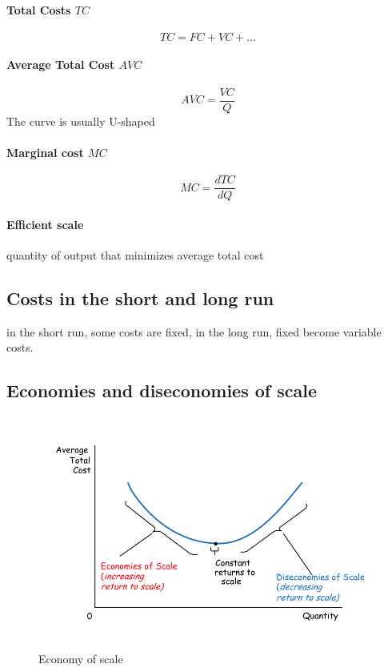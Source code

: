 \documentclass[a4paper,titlepage] {scrartcl}
\begin{document}
\paragraph{Total Costs $TC$} %
\label{par:total_costs_tc_}
\begin{equation}
	TC = FC + VC +\dots
\end{equation}

\paragraph{Average Total Cost $AVC$} %
\label{par:average_total_cost}
\begin{equation}
	AVC = \frac{VC}{Q}
\end{equation}
The curve is usually U-shaped

\paragraph{Marginal cost $MC$} %
\label{par:marginal_cost}
\begin{equation}
	MC = \frac{dTC}{dQ}
\end{equation}

\paragraph{Efficient scale} %
\label{par:efficient_scale}
quantity of output that minimizes average total cost


\subsection{Costs in the short and long run}
in the short run, some costs are fixed, in the long run, fixed become variable costs.

\subsection{Economies and diseconomies of scale}
\begin{figure}[htbp]
	\centering
		\includegraphics[height=3in]{images/ecoscale.png}
	\caption{Economy of scale}
	\label{fig:images_ecoscale}
\end{figure}
\end{document}
